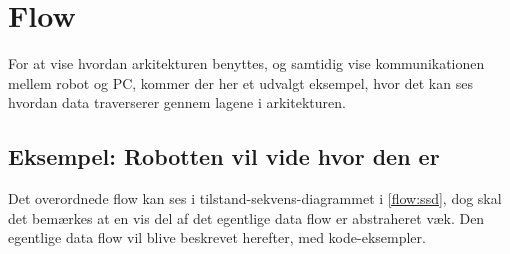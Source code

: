 
\section{Flow}
For at vise hvordan arkitekturen benyttes, og samtidig vise kommunikationen mellem robot og PC, kommer der her et udvalgt eksempel, hvor det kan ses hvordan data traverserer gennem lagene i arkitekturen.

\subsection{Eksempel: Robotten vil vide hvor den er}
Det overordnede flow kan ses i tilstand-sekvens-diagrammet i \cref{flow:ssd}, dog skal det bemærkes at en vis del af det egentlige data flow er abstraheret væk.
Den egentlige data flow vil blive beskrevet herefter, med kode-eksempler.

